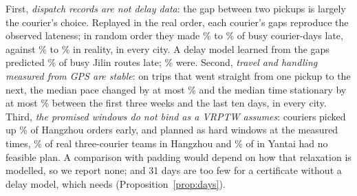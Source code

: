 \documentclass[11pt,a4paper]{article}
\theoremstyle{remark}
\begin{document}
First, \emph{dispatch records are not delay data}: the gap between two pickups is
largely the courier's choice. Replayed in the real order, each courier's gaps
reproduce the observed lateness; in random order they made
\LfShuMin\% to \LfShuMax\% of \LfCourierDays{} busy courier-days late, against \LfObsMin\%
to \LfObsMax\% in reality, in every city. A delay model learned from the gaps predicted
\LfLogsPred\% of \LfLogsN{} busy Jilin routes late; \LfLogsObs\% were. Second,
\emph{travel and handling measured from GPS are stable}: on trips that went straight
from one pickup to the next, the median pace changed by at most \LfPaceMaxChange\% and
the median time stationary by at most \LfStillMaxChange\% between the first three weeks
and the last ten days, in every city. Third, \emph{the promised windows do not bind as
a VRPTW assumes}: couriers picked up \LfEarlyHz\% of Hangzhou orders early, and planned
as hard windows at the measured times, \LfInfeasHz\% of \LfTeamsHz{} real three-courier
teams in Hangzhou and \LfInfeasYt\% of \LfTeamsYt{} in Yantai had no feasible plan. A
comparison with padding would depend on how that relaxation is modelled, so we report
none; and 31 days are too few for a certificate without a delay model, which needs
\LfDaysZero{} (Proposition~\ref{prop:days}).


\end{document}
